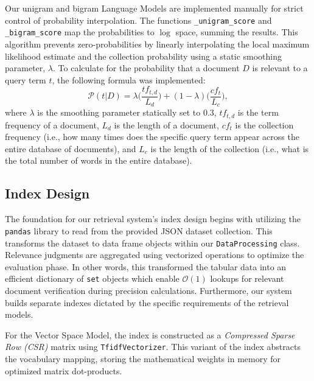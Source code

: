 Our unigram and bigram Language Models are implemented manually for 
strict control of probability interpolation. The functions
\texttt{\_unigram\_score} and \texttt{\_bigram\_score} map the probabilities 
to $\log$ space, summing the results. This algorithm prevents zero-probabilities 
by linearly interpolating the local maximum likelihood estimate and the 
collection probability using a static smoothing parameter, $\lambda$. To 
calculate for the probability that a document $D$ is relevant to a query 
term $t$, the following formula was implemented:
$$\mathcal{P}(t|D) = \lambda \Bigg(\frac{tf_{t,d}}{L_d}\Bigg) + (1-\lambda) 
\Bigg(\frac{cf_t}{L_c}\Bigg),$$
where $\lambda$ is the smoothing parameter statically set to $0.3$, $tf_{t,d}$ 
is the term frequency of a document, $L_d$ is the length of a document, 
$cf_t$ is the collection frequency (i.e., how many times does the specific 
query term appear across the entire database of documents), and $L_c$ is the 
length of the collection (i.e., what is the total number of words in the entire 
database).

\subsection*{Index Design}
{}

The foundation for our retrieval system's index design begins with utilizing 
the \texttt{pandas} library to read from the provided JSON dataset 
collection. This transforms the dataset to data frame objects within our 
\texttt{DataProcessing} class. Relevance judgments are aggregated using 
vectorized operations to optimize the evaluation phase. In other words, 
this transformed the tabular data into an efficient dictionary of 
\texttt{set} objects which enable $\mathcal{O}(1)$ lookups for relevant 
document verification during precision calculations. Furthermore, 
our system builds separate indexes dictated by the specific requirements 
of the retrieval models. 

For the Vector Space Model, the index is constructed as a \textit{Compressed
Sparse Row (CSR)} matrix using \texttt{TfidfVectorizer}. This variant of the 
index abstracts the vocabulary mapping, storing the mathematical weights in 
memory for optimized matrix dot-products. 

